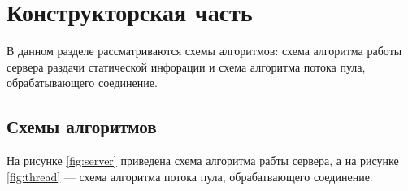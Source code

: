 \section{\large Конструкторская часть}

В  данном  разделе  рассматриваются схемы алгоритмов: схема алгоритма работы сервера раздачи статической инфорации и схема алгоритма потока пула, обрабатывающего соединение.

\subsection{Схемы алгоритмов}

На рисунке \ref{fig:server} приведена схема алгоритма рабты сервера, а на рисунке \ref{fig:thread} --- схема алгоритма потока пула, обрабатвающего соединение.

